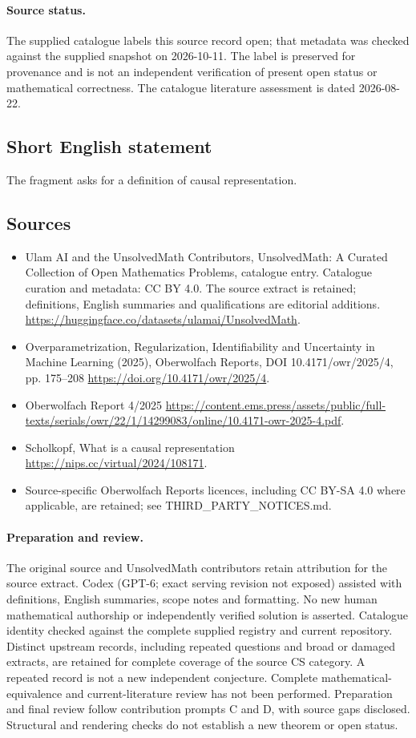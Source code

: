 \documentclass[11pt]{article}
\begin{document}
\paragraph{Source status.}
The supplied catalogue labels this source record open; that metadata was checked against the supplied snapshot on 2026-10-11. The label is preserved for provenance and is not an independent verification of present open status or mathematical correctness. The catalogue literature assessment is dated 2026-08-22.
\subsection{Short English statement}
The fragment asks for a definition of causal representation.
\subsection{Sources}
\begin{itemize}
\item[\hypertarget{source:statement:1}{S1}] Ulam AI and the UnsolvedMath Contributors, UnsolvedMath: A Curated Collection of Open Mathematics Problems, catalogue entry. Catalogue curation and metadata: CC BY 4.0. The source extract is retained; definitions, English summaries and qualifications are editorial additions.
\url{https://huggingface.co/datasets/ulamai/UnsolvedMath}.
\item[\hypertarget{source:statement:2}{S2}] Overparametrization, Regularization, Identifiability and Uncertainty in Machine Learning (2025), Oberwolfach Reports, DOI 10.4171/owr/2025/4, pp. 175--208
\url{https://doi.org/10.4171/owr/2025/4}.
\item[\hypertarget{source:statement:3}{S3}] Oberwolfach Report 4/2025
\url{https://content.ems.press/assets/public/full-texts/serials/owr/22/1/14299083/online/10.4171-owr-2025-4.pdf}.
\item[\hypertarget{source:statement:4}{S4}] Scholkopf, What is a causal representation
\url{https://nips.cc/virtual/2024/108171}.
\item Source-specific Oberwolfach Reports licences, including CC BY-SA 4.0 where applicable, are retained; see THIRD\_PARTY\_NOTICES.md.
\end{itemize}
\paragraph{Preparation and review.}
The original source and UnsolvedMath contributors retain attribution for the source extract. Codex (GPT-6; exact serving revision not exposed) assisted with definitions, English summaries, scope notes and formatting. No new human mathematical authorship or independently verified solution is asserted. Catalogue identity checked against the complete supplied registry and current repository. Distinct upstream records, including repeated questions and broad or damaged extracts, are retained for complete coverage of the source CS category. A repeated record is not a new independent conjecture. Complete mathematical-equivalence and current-literature review has not been performed. Preparation and final review follow contribution prompts C and D, with source gaps disclosed. Structural and rendering checks do not establish a new theorem or open status.
\label{end:statement}
\end{document}
